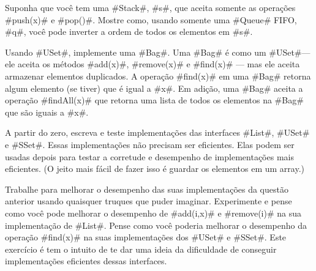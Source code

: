 \begin{exc}
  Suponha que você tem uma 
 #Stack#, #s#, que aceita somente as operações #push(x)#
  e #pop()#. Mostre como, usando somente uma #Queue# FIFO, #q#,
  você pode inverter a ordem de todos os elementos em #s#.
\end{exc}

\begin{exc}
Usando #USet#, implemente uma #Bag#.  Uma #Bag# é como um #USet#---ele aceita os métodos 
#add(x)#, #remove(x)# e #find(x)# --- mas ele aceita armazenar elementos duplicados. A operação #find(x)# em uma #Bag# retorna
  algum elemento (se tiver) que é igual a #x#. Em adição, uma 
  #Bag# aceita a operação #findAll(x)# que retorna uma lista de todos os elementos
  na #Bag# que são iguais a #x#.
\end{exc}

\begin{exc}
  A partir do zero, escreva e teste implementações das interfaces #List#, #USet# 
  e #SSet#. Essas implementações não precisam ser eficientes. Elas podem ser usadas depois para testar a corretude e desempenho de implementações mais eficientes. (O jeito mais fácil de fazer isso é guardar os elementos em um array.)
\end{exc}

\begin{exc}
Trabalhe para melhorar o desempenho das suas implementações da questão anterior usando quaisquer truques que puder imaginar. Experimente e pense como você pode melhorar o desempenho de #add(i,x)# e #remove(i)# na sua implementação de #List#. Pense como você poderia melhorar o desempenho da operação #find(x)# na suas implementações dos #USet# e #SSet#. Este exercício é tem o intuito de te dar uma ideia da dificuldade de conseguir implementações eficientes dessas interfaces.
\end{exc}
